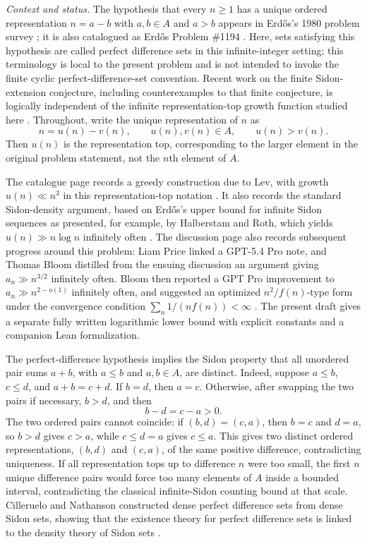 \documentclass[11pt]{article}
\begin{document}
\medskip
\noindent\textit{Context and status.} The hypothesis that every $n\ge1$ has a unique ordered
representation $n=a-b$ with $a,b\in A$ and $a>b$ appears in Erd\H{o}s's 1980 problem survey
\cite[p.~100]{Erdos1980}; it is also catalogued as Erd\H{o}s Problem \#1194
\cite{Bloom1194}. Here, sets satisfying this hypothesis are called perfect difference sets in
this infinite-integer setting; this terminology is local to the present problem and is not intended
to invoke the finite cyclic perfect-difference-set convention. Recent work on the finite
Sidon-extension conjecture, including counterexamples to that finite conjecture, is logically
independent of the infinite representation-top growth function studied here
\cite{AlexeevMixon2026}. Throughout, write the unique representation of $n$ as
\[
n=u(n)-v(n),
\qquad
u(n),v(n)\in A,
\qquad
u(n)>v(n).
\]
Then $u(n)$ is the representation top, corresponding to the larger element in the original
problem statement, not the $n$th element of $A$.

The catalogue page records a greedy construction due to Lev, with growth $u(n)\ll n^3$ in this
representation-top notation \cite{Lev2004,Bloom1194}. It also records the standard Sidon-density
argument, based on Erd\H{o}s's upper bound for infinite Sidon sequences as presented, for example,
by Halberstam and Roth, which yields $u(n)\gg n\log n$ infinitely often
\cite{HalberstamRoth1966,Bloom1194}. The discussion page also records subsequent progress around
this problem: Liam Price linked a GPT-5.4 Pro note, and Thomas Bloom distilled from the ensuing
discussion an argument giving $a_n\gg n^{3/2}$ infinitely often. Bloom then reported a GPT Pro
improvement to $a_n\gg n^{2-o(1)}$ infinitely often, and suggested an optimized
$n^2/f(n)$-type form under the convergence condition $\sum_n 1/(n f(n))<\infty$
\cite{Bloom1194}. The present draft gives a separate fully written logarithmic lower bound with
explicit constants and a companion Lean formalization.

The perfect-difference hypothesis implies the Sidon property that all unordered pair sums
$a+b$, with $a\le b$ and $a,b\in A$, are distinct. Indeed, suppose $a\le b$, $c\le d$, and
$a+b=c+d$. If $b=d$, then $a=c$. Otherwise, after swapping the two pairs if necessary, $b>d$, and
then
\[
b-d=c-a>0.
\]
The two ordered pairs cannot coincide: if $(b,d)=(c,a)$, then $b=c$ and $d=a$, so
$b>d$ gives $c>a$, while $c\le d=a$ gives $c\le a$. This gives two distinct ordered
representations, $(b,d)$ and $(c,a)$, of the same positive difference, contradicting uniqueness.
If all representation tops up to difference $n$ were too
small, the first $n$ unique difference pairs would force too many elements of $A$ inside a bounded
interval, contradicting the classical infinite-Sidon counting bound at that scale. Cilleruelo and
Nathanson constructed dense perfect difference sets from dense Sidon sets, showing that the
existence theory for perfect difference sets is linked to the density theory of Sidon sets
\cite{CillerueloNathanson2008}.
\end{document}
